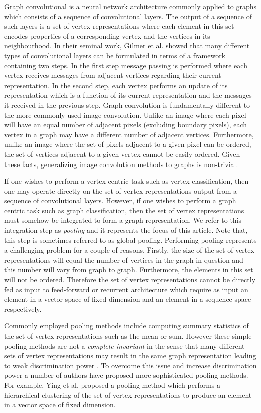 \documentclass[runningheads]{llncs}
\begin{document}
Graph convolutional is a neural network architecture commonly applied to graphs which consists of a sequence of convolutional layers. The output of a sequence of such layers is a set of vertex representations where each element in this set encodes properties of a corresponding vertex and the vertices in its neighbourhood. In their seminal work, Gilmer et al. \cite{gilmer2017} showed that many different types of convolutional layers can be formulated in terms of a framework containing two steps. In the first step message passing is performed where each vertex receives messages from adjacent vertices regarding their current representation. In the second step, each vertex performs an update of its representation which is a function of its current representation and the messages it received in the previous step. Graph convolution is fundamentally different to the more commonly used image convolution. Unlike an image where each pixel will have an equal number of adjacent pixels (excluding boundary pixels), each vertex in a graph may have a different number of adjacent vertices. Furthermore, unlike an image where the set of pixels adjacent to a given pixel can be ordered, the set of vertices adjacent to a given vertex cannot be easily ordered. Given these facts, generalizing image convolution methods to graphs is non-trivial.

If one wishes to perform a vertex centric task such as vertex classification, then one may operate directly on the set of vertex representations output from a sequence of convolutional layers. However, if one wishes to perform a graph centric task such as graph classification, then the set of vertex representations must somehow be integrated to form a graph representation. We refer to this integration step as \textit{pooling} and it represents the focus of this article. Note that, this step is sometimes referred to as global pooling. Performing pooling represents a challenging problem for a couple of reasons. Firstly, the size of the set of vertex representations will equal the number of vertices in the graph in question and this number will vary from graph to graph. Furthermore, the elements in this set will not be ordered. Therefore the set of vertex representations cannot be directly fed as input to feed-forward or recurrent architecture which require as input an element in a vector space of fixed dimension and an element in a sequence space respectively.

Commonly employed pooling methods include computing summary statistics of the set of vertex representations such as the mean or sum. However these simple pooling methods are not a \textit{complete invariant} in the sense that many different sets of vertex representations may result in the same graph representation leading to weak discrimination power \cite{xu2018}. To overcome this issue and increase discrimination power a number of authors have proposed more sophisticated pooling methods. For example, Ying et al. \cite{ying2018} proposed a pooling method which performs a hierarchical clustering of the set of vertex representations to produce an element in a vector space of fixed dimension.
\end{document}
